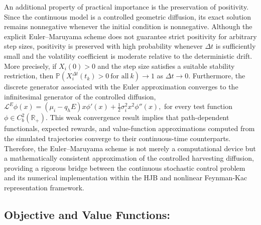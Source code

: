 \documentclass[11pt]{article}
\begin{document}
	An additional property of practical importance is the preservation of positivity. Since the continuous model is a controlled geometric diffusion, its exact solution remains nonnegative whenever the initial condition is nonnegative. Although the explicit Euler--Maruyama scheme does not guarantee strict positivity for arbitrary step sizes, positivity is preserved with high probability whenever $\Delta t$ is sufficiently small and the volatility coefficient is moderate relative to the deterministic drift. More precisely, if $X_i(0)>0$ and the step size satisfies a suitable stability restriction, then
	$
	\mathbb{P}\!\left(
	X_i^{\Delta t}(t_k)>0
	\ \text{for all}\ k
	\right)\rightarrow 1
	$
	as $\Delta t\rightarrow0$. Furthermore, the discrete generator associated with the Euler approximation converges to the infinitesimal generator of the controlled diffusion,
	$
	\mathcal{L}^E\phi(x)
	=
	(\mu_i-q_hE)x\phi'(x)
	+
	\frac12\sigma_i^2x^2\phi''(x),
	$
	for every test function $\phi\in C_b^2(\mathbb{R}_+)$. This weak convergence result implies that path-dependent functionals, expected rewards, and value-function approximations computed from the simulated trajectories converge to their continuous-time counterparts. Therefore, the Euler--Maruyama scheme is not merely a computational device but a mathematically consistent approximation of the controlled harvesting diffusion, providing a rigorous bridge between the continuous stochastic control problem and its numerical implementation within the HJB and nonlinear Feynman-Kac representation framework.
	
	\subsection{Objective and Value Functions:}
	
\end{document}
